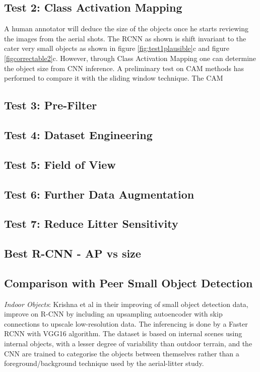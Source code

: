\documentclass{IEEEtran}
\begin{document}
\subsection{Test 2: Class Activation Mapping}

A human annotator will deduce the size of the objects once he starts reviewing the images from the aerial shots. The RCNN as shown is shift invariant to the cater very small objects as shown in figure \ref{fig:test1plausible}c and figure \ref{figcorrectable2}c. However, through Class Activation Mapping  one can determine the object size from CNN inference. A preliminary test on CAM methods has performed to compare it with the sliding window technique. The CAM 

\subsection{Test 3: Pre-Filter}

\subsection{Test 4: Dataset Engineering}

\subsection{Test 5: Field of View}

\subsection{Test 6: Further Data Augmentation}

\subsection{Test 7: Reduce Litter Sensitivity}

\subsection{Best R-CNN - AP vs size}

\subsection{Comparison with Peer Small Object Detection}

\textit{Indoor Objects}: Krishna et al \cite{Krishna} in their improving of small object detection data, improve on R-CNN by including an upsampling autoencoder with skip connections to upscale low-resolution data. The inferencing is done by a Faster RCNN with VGG16 algorithm. The dataset is based on internal scenes using internal objects, with a lesser degree of variability than outdoor terrain, and the CNN are trained to categorise the objects between themselves rather than a foreground/background technique used by the aerial-litter study.
\end{document}
